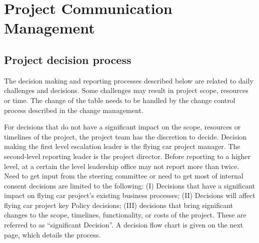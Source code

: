 \chapter{Project Communication Management}

\section{Project decision process}

The decision making and reporting processes described below are related to daily challenges and decisions. Some challenges may result in project scope, resources or time. The change of the table needs to be handled by the change control process described in the change management. 

For decisions that do not have a significant impact on the scope, resources or timelines of the project, the project team has the discretion to decide. Decision making the first level escalation leader is the flying car project manager. The second-level reporting leader is the project director. Before reporting to a higher level, at a certain the level leadership office may not report more than twice. Need to get input from the steering committee or need to get most of internal consent decisions are limited to the following: (I) Decisions that have a significant impact on flying car project's existing business processes; (II) Decisions will affect flying car project key Policy decisions; (III) decisions that bring significant changes to the scope, timelines, functionality, or costs of the project. These are referred to as “significant Decision”. A decision flow chart is given on the next page, which details the process. 

